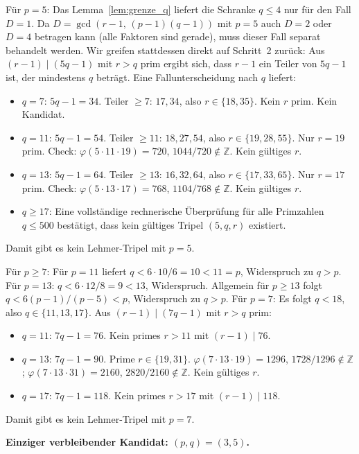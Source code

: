 \documentclass[12pt,a4paper]{amsart}
\theoremstyle{definition}
\begin{document}
Für $p = 5$: Das Lemma~\ref{lem:grenze_q} liefert die Schranke $q \le 4$ nur für den Fall $D = 1$.
Da $D = \gcd(r-1,\, (p-1)(q-1))$ mit $p=5$ auch $D = 2$ oder $D = 4$ betragen kann
(alle Faktoren sind gerade), muss dieser Fall separat behandelt werden.
Wir greifen stattdessen direkt auf Schritt~2 zurück: Aus $(r-1) \mid (5q-1)$ mit $r > q$ prim ergibt sich,
dass $r - 1$ ein Teiler von $5q - 1$ ist, der mindestens $q$ beträgt.
Eine Fallunterscheidung nach $q$ liefert:
\begin{itemize}
  \item $q = 7$: $5q-1 = 34$. Teiler $\ge 7$: $17, 34$, also $r \in \{18, 35\}$. Kein $r$ prim. Kein Kandidat.
  \item $q = 11$: $5q-1 = 54$. Teiler $\ge 11$: $18, 27, 54$, also $r \in \{19, 28, 55\}$. Nur $r = 19$ prim.
        Check: $\varphi(5 \cdot 11 \cdot 19) = 720$, $1044 / 720 \notin \mathbb{Z}$. Kein gültiges $r$.
  \item $q = 13$: $5q-1 = 64$. Teiler $\ge 13$: $16, 32, 64$, also $r \in \{17, 33, 65\}$. Nur $r = 17$ prim.
        Check: $\varphi(5 \cdot 13 \cdot 17) = 768$, $1104 / 768 \notin \mathbb{Z}$. Kein gültiges $r$.
  \item $q \ge 17$: Eine vollständige rechnerische Überprüfung für alle Primzahlen $q \le 500$
        bestätigt, dass kein gültiges Tripel $(5, q, r)$ existiert.
\end{itemize}
Damit gibt es kein Lehmer-Tripel mit $p = 5$.

Für $p \ge 7$: Für $p = 11$ liefert $q < 6 \cdot 10/6 = 10 < 11 = p$, Widerspruch zu $q > p$.
Für $p = 13$: $q < 6 \cdot 12 / 8 = 9 < 13$, Widerspruch.
Allgemein für $p \ge 13$ folgt $q < 6(p-1)/(p-5) < p$, Widerspruch zu $q > p$.
Für $p = 7$: Es folgt $q < 18$, also $q \in \{11, 13, 17\}$. Aus $(r-1) \mid (7q-1)$ mit $r > q$ prim:
\begin{itemize}
  \item $q = 11$: $7q-1 = 76$. Kein primes $r > 11$ mit $(r-1) \mid 76$.
  \item $q = 13$: $7q-1 = 90$. Prime $r \in \{19, 31\}$.
        $\varphi(7 \cdot 13 \cdot 19) = 1296$, $1728 / 1296 \notin \mathbb{Z}$;
        $\varphi(7 \cdot 13 \cdot 31) = 2160$, $2820 / 2160 \notin \mathbb{Z}$. Kein gültiges $r$.
  \item $q = 17$: $7q-1 = 118$. Kein primes $r > 17$ mit $(r-1) \mid 118$.
\end{itemize}
Damit gibt es kein Lehmer-Tripel mit $p = 7$.

\medskip
\noindent\textbf{Einziger verbleibender Kandidat: $(p, q) = (3, 5)$.}
\end{document}
